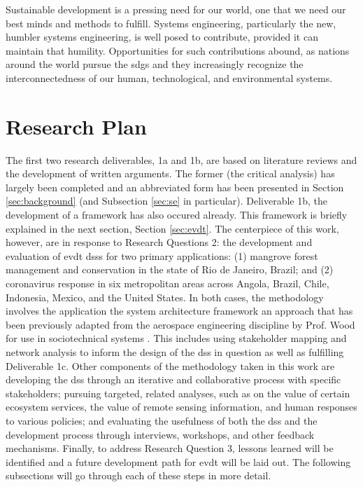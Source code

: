 \documentclass[notitlepage]{article}
\begin{document}
Sustainable development is a pressing need for our world, one that we need our best minds and methods to fulfill. Systems engineering, particularly the new, humbler systems engineering, is well posed to contribute, provided it can maintain that humility. Opportunities for such contributions abound, as nations around the world pursue the \acp{sdg} and they increasingly recognize the interconnectedness of our human, technological, and environmental systems.


\section{Research Plan}\label{sec:plan}

The first two research deliverables, 1a and 1b, are based on literature reviews and the development of written arguments. The former (the critical analysis) has largely been completed and an abbreviated form has been presented in Section \ref{sec:background} (and Subsection \ref{sec:se} in particular). Deliverable 1b, the development of a framework has also occured already. This framework is briefly explained in the next section, Section \ref{sec:evdt}. The centerpiece of this work, however, are in response to Research Questions 2: the development and evaluation of \ac{evdt} \acp{dss} for two primary applications: (1) mangrove forest management and conservation in the state of Rio de Janeiro, Brazil; and (2) coronavirus response in six metropolitan areas across Angola, Brazil, Chile, Indonesia, Mexico, and the United States. In both cases, the methodology involves the application the system architecture framework \cite{maierArtSystemsArchitecting2009, crawleySystemArchitectureStrategy2015} an approach that has been previously adapted from the aerospace engineering discipline by Prof. Wood for use in sociotechnical systems \cite{pfotenhauerArchitectingComplexInternational2016}. This includes using stakeholder mapping and network analysis to inform the design of the \ac{dss} in question as well as fulfilling Deliverable 1c. Other components of the methodology taken in this work are developing the \ac{dss} through an iterative and collaborative process with specific stakeholders; pursuing targeted, related analyses, such as on the value of certain ecosystem services, the value of remote sensing information, and human responses to various policies; and evaluating the usefulness of both the \ac{dss} and the development process through interviews, workshops, and other feedback mechanisms. Finally, to address Research Question 3, lessons learned will be identified and a future development path for \ac{evdt} will be laid out. The following subsections will go through each of these steps in more detail.
\end{document}
